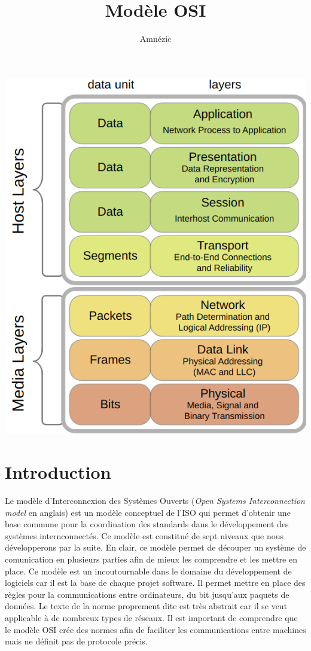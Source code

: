 \documentclass{article}
\author{Amnézic}
\date{}
\title{Modèle OSI}
\begin{document}
\maketitle
\includegraphics[scale=0.5]{OSI_model.png}
\newpage
\tableofcontents
\newpage

\section{Introduction}
Le modèle d'Interconnexion des Systèmes Ouverts (\textit{Open Systems Interconnection model} en anglais) est un modèle conceptuel de l'ISO qui permet d'obtenir une base commune pour la coordination des standards dans le développement des systèmes internconnectés. Ce modèle est constitué de sept niveaux que nous développerons par la suite. En clair, ce modèle permet de découper un système de comunication en plusieurs parties afin de mieux les comprendre et les mettre en place. Ce modèle est un incoutournable dans le domaine du développement de logiciels car il est la base de chaque projet software. Il permet mettre en place des règles pour la communications entre ordinateurs, du bit jusqu'aux paquets de données. Le texte de la norme proprement dite est très abstrait car il se veut applicable à de nombreux types de réseaux.
Il est important de comprendre que le modèle OSI crée des normes afin de faciliter les communications entre machines mais ne définit pas de protocole précis.
\end{document}
